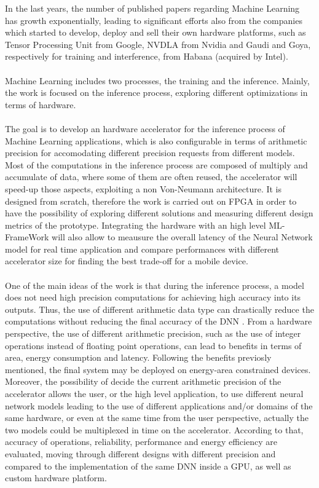 In the last years, the number of published papers regarding Machine Learning has growth exponentially, leading to significant efforts also from the companies which started to develop, deploy and sell their own hardware platforms, such as Tensor Processing Unit \cite{paper:40} from Google, NVDLA\cite{WEBSITE:6} from Nvidia and Gaudi \cite{paper:39} and Goya\cite{paper:38}, respectively for training and interference, from Habana (acquired by Intel).\\\\
Machine Learning includes two processes, the training and the inference. Mainly, the work is focused on the inference process, exploring different optimizations in terms of hardware.\\\\The goal is to develop an hardware accelerator for the inference process of Machine Learning applications, which is also configurable in terms of arithmetic precision for accomodating different precision requests from different models. Most of the computations in the inference process are composed of multiply and accumulate of data, where some of them are often reused, the accelerator will speed-up those aspects, exploiting a non Von-Neumann architecture. It is designed from scratch, therefore the work is carried out on FPGA in order to have the possibility of exploring different solutions and measuring different design metrics of the prototype. Integrating the hardware with an high level ML-FrameWork will also allow to meausure the overall latency of the Neural Network model for real time application and compare performances with different accelerator size for finding the best trade-off for a mobile device.\\\\
One of the main ideas of the work is that during the inference process, a model does not need high precision computations \cite{paper:8} \cite{paper:15}for achieving high accuracy into its outputs. Thus, the use of different arithmetic data type can drastically reduce the computations without reducing the final accuracy of the DNN \cite{paper:7} \cite{paper:8}. From a hardware perspective,  the use of different arithmetic precision\cite{paper:14}, such as the use of integer operations instead of floating point operations, can lead to benefits in terms of area, energy consumption and latency. Following the benefits previosly mentioned, the final system may be deployed on energy-area constrained devices. Moreover, the possibility of decide the current arithmetic precision of the accelerator allows the user, or the high level application, to use different neural network models leading to the use of different  applications and/or domains of the same hardware, or even at the same time from the user perspective, actually the two models could be multiplexed in time on the accelerator.\newline
According to that, accuracy of operations, reliability, performance and energy efficiency are evaluated, moving through different designs with different precision and compared to the implementation of the same DNN inside a GPU, as well as custom hardware platform.
